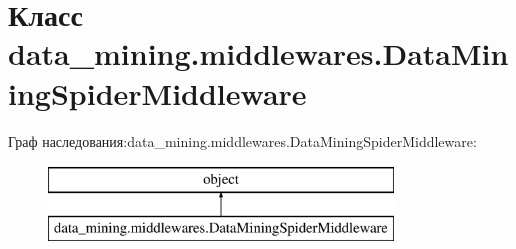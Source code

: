 \hypertarget{classdata__mining_1_1middlewares_1_1DataMiningSpiderMiddleware}{}\section{Класс data\+\_\+mining.\+middlewares.\+Data\+Mining\+Spider\+Middleware}
\label{classdata__mining_1_1middlewares_1_1DataMiningSpiderMiddleware}
Граф наследования\+:data\+\_\+mining.\+middlewares.\+Data\+Mining\+Spider\+Middleware\+:\begin{figure}[H]
\begin{center}
\leavevmode
\includegraphics[height=2.000000cm]{classdata__mining_1_1middlewares_1_1DataMiningSpiderMiddleware}
\end{center}
\end{figure}

